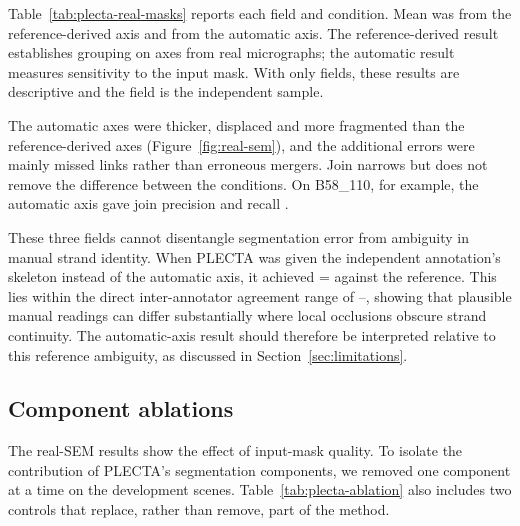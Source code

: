 \begin{table}[tbp]
    \centering
    \caption{Segmentation from reference-derived and automatic axes in three
    CNT SEM fields. Coverage is the fraction of the frame covered by full-width
    reference strands. Metrics are defined in Section~\ref{sec:mm-metrics};
    detection \Fone{} uses IoU \PlectaDetectionIoU{} and tolerance
    \PlectaPlacementTolerance{}\,px.}
    \label{tab:plecta-real-masks}
    \setlength{\tabcolsep}{3pt}
    
\end{table}

Table~\ref{tab:plecta-real-masks} reports each field and condition. Mean
\Fone{} was \PlectaRealManualFOneMean{} from the reference-derived axis and
\PlectaRealUNetFOneMean{} from the automatic axis. The reference-derived
result establishes grouping on axes from real micrographs; the automatic
result measures sensitivity to the input mask. With only
\PlectaRealFieldCount{} fields, these results are descriptive and the field is
the independent sample.

The automatic axes were thicker, displaced and more fragmented than the
reference-derived axes (Figure~\ref{fig:real-sem}), and the additional errors
were mainly missed links rather than erroneous mergers. Join \Fone{} narrows
but does not remove the difference between the conditions. On B58\_110, for
example, the automatic axis gave join precision
\PlectaJoinBFiveEightOneOneZeroUNetPrecision{} and recall
\PlectaJoinBFiveEightOneOneZeroUNetRecall{}.

These three fields cannot disentangle segmentation error from ambiguity in
manual strand identity. When PLECTA was given the independent annotation's
skeleton instead of the automatic axis, it achieved
\Fone{}=\PlectaInterAnnotatorBOnAFOneMean{} against the reference. This lies
within the direct inter-annotator agreement range of
\PlectaInterAnnotatorAgreeFLow{}--\PlectaInterAnnotatorAgreeFHigh{}, showing
that plausible manual readings can differ substantially where local occlusions
obscure strand continuity. The automatic-axis result should therefore be
interpreted relative to this reference ambiguity, as discussed in
Section~\ref{sec:limitations}.

\subsection{Component ablations}
\label{sec:res-ablation}

The real-SEM results show the effect of input-mask quality. To isolate the
contribution of PLECTA's segmentation components, we removed one component
at a time on the development scenes. Table~\ref{tab:plecta-ablation} also
includes two controls that replace, rather than remove, part of the method.

